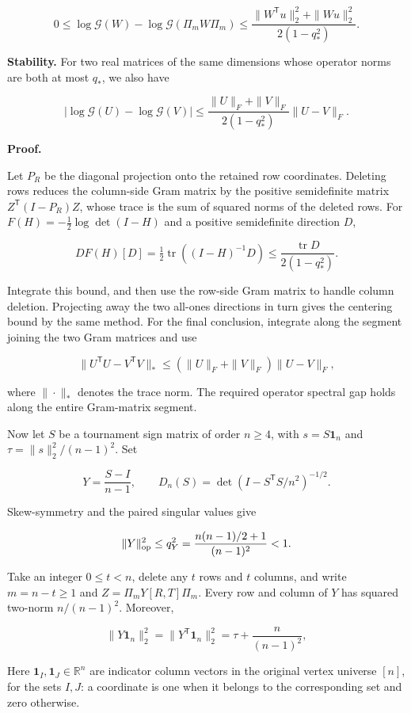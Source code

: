 \documentclass[11pt,a4paper]{article}
\begin{document}
\[
0\le\log\mathcal G(W)-\log\mathcal G(\Pi_mW\Pi_m)\le\frac{\|W^{\mathsf T}u\|_2^2+\|Wu\|_2^2}{2(1-q_*^2)}.
\]

\textbf{Stability.} For two real matrices of the same dimensions whose operator norms are both at most \(q_*\), we also have

\[
|\log\mathcal G(U)-\log\mathcal G(V)|\le\frac{\|U\|_F+\|V\|_F}{2(1-q_*^2)}\|U-V\|_F.
\]

\textbf{Proof.}

Let \(P_R\) be the diagonal projection onto the retained row coordinates. Deleting rows reduces the column-side Gram matrix by the positive semidefinite matrix \(Z^{\mathsf T}(I-P_R)Z\), whose trace is the sum of squared norms of the deleted rows. For \(F(H)=-\tfrac12\log\det(I-H)\) and a positive semidefinite direction \(D\),

\[
DF(H)[D]=\tfrac12\operatorname{tr}((I-H)^{-1}D)\le\frac{\operatorname{tr}D}{2(1-q_*^2)}.
\]

Integrate this bound, and then use the row-side Gram matrix to handle column deletion. Projecting away the two all-ones directions in turn gives the centering bound by the same method. For the final conclusion, integrate along the segment joining the two Gram matrices and use

\[
\|U^{\mathsf T}U-V^{\mathsf T}V\|_*\le(\|U\|_F+\|V\|_F)\|U-V\|_F,
\]

where \(\|\cdot\|_*\) denotes the trace norm. The required operator spectral gap holds along the entire Gram-matrix segment.

Now let \(S\) be a tournament sign matrix of order \(n\ge4\), with \(s=S\mathbf 1_n\) and \(\tau=\|s\|_2^2/(n-1)^2\). Set

\[
Y=\frac{S-I}{n-1},\qquad D_n(S)=\det(I-S^{\mathsf T}S/n^2)^{-1/2}.
\]

Skew-symmetry and the paired singular values give

\[
\|Y\|_{\rm op}^2\le q_Y^2=\frac{n(n-1)/2+1}{(n-1)^2}<1.
\]

Take an integer \(0\le t<n\), delete any \(t\) rows and \(t\) columns, and write \(m=n-t\ge1\) and \(Z=\Pi_mY[R,T]\Pi_m\). Every row and column of \(Y\) has squared two-norm \(n/(n-1)^2\). Moreover,

\[
\|Y\mathbf 1_n\|_2^2=\|Y^{\mathsf T}\mathbf 1_n\|_2^2=\tau+\frac n{(n-1)^2},
\]

Here \(\mathbf1_I,\mathbf1_J\in\mathbb R^n\) are indicator column vectors in the original vertex universe \([n]\), for the sets \(I,J\): a coordinate is one when it belongs to the corresponding set and zero otherwise.
\end{document}
